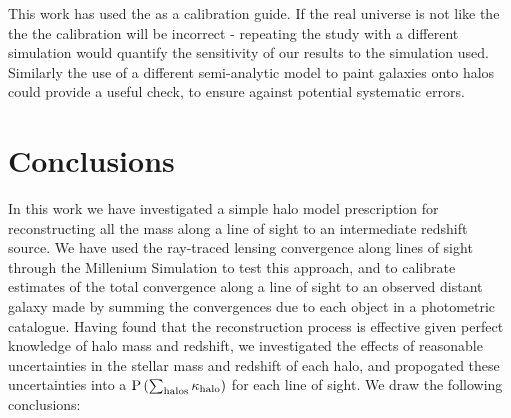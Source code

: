 \documentclass[useAMS,usenatbib]{mn2e}
\begin{document}
This work has used the \MS as a calibration guide. If the real universe is not like 
the \MS the the calibration will be incorrect - repeating the study with a different
simulation would quantify the sensitivity of our results to the simulation used. Similarly
the use of a different semi-analytic model to paint galaxies onto halos could provide
a useful check, to ensure against potential systematic errors.



\section{Conclusions}
\label{sec:conclude}

In this work we have investigated a simple halo model prescription for
reconstructing all the mass along a line of sight to an intermediate redshift
source. We have used the ray-traced lensing convergence along lines of sight
through the Millenium Simulation to test this approach, and to calibrate
estimates of the total convergence along a line of sight to an observed
distant galaxy made by summing the convergences due to each object in a
photometric catalogue. Having found that the reconstruction process is effective given perfect
knowledge of halo mass and redshift, we investigated the effects of reasonable
uncertainties in the stellar mass and redshift of each halo, and propogated
these uncertainties into a ${\rm P}\left(\sum_{\rm halos} \kappa_{\rm halo}\right)$ for each line of
sight. We draw the following conclusions:
\end{document}

